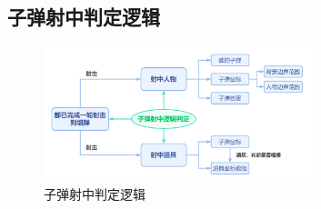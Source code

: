 \subsection{子弹射中判定逻辑}
\begin{figure}[htbp]
    \vspace{13pt} %
    \centering
    \includegraphics[width=0.7\textwidth]{images/3-7.jpg}
    \caption{子弹射中判定逻辑}%
\end{figure}
\par
